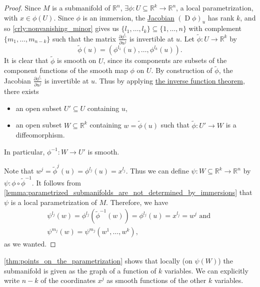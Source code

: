 \documentclass[notoc,notitlepage]{tufte-book}
\DeclareMathOperator{\D}{D}
\begin{document}
\begin{proof}
  Since $M$ is a submanifold of $\mathbb{R}^n$, $\exists \phi : U \subseteq
  \mathbb{R}^k \to \mathbb{R}^n$, a local parametrization, with $x \in \phi(U)$.
  Since $\phi$ is an immersion, the \hyperref[defn:differential]{Jacobian} $(\D
  \phi)_u$ has rank $k$, and so \cref{crly:nonvanishing_minor} gives us $\{ l_1,
  \ldots, l_k \} \subseteq \{ 1, \ldots, n \}$ with complement $\{ m_1,
  \ldots, m_{n - k} \}$ such that the matrix $\frac{\partial \phi^{l_i}}{\partial
  u^j}$ is invertible at $u$. Let $\tilde{\phi} : U \to \mathbb{R}^k$ by
  \begin{equation*}
    \tilde{\phi}(u) = (\phi^{l_1}(u), \ldots, \phi^{l_k}(u)).
  \end{equation*}
  It is clear that $\tilde{\phi}$ is smooth on $U$, since its components are
  subsets of the component functions of the smooth map $\phi$ on $U$. By
  construction of $\tilde{\phi}$, the Jacobian $\frac{\partial
  \phi^{l_i}}{\partial u^j}$ is invertible at $u$. Thus by applying
  \hyperref[thm:inverse_function_theorem]{the inverse function theorem}, there
  exists
  \begin{itemize}
    \item an open subset $U' \subseteq U$ containing $u$,
    \item an open subset $W \subseteq \mathbb{R}^k$ containing $w =
      \tilde{\phi}(u)$ such that $\tilde{\phi} : U' \to W$ is a diffeomorphism.
  \end{itemize}
  In particular, $\phi^{-1} : W \to U'$ is smooth.

  Note that $w^j = \tilde{\phi}^j(u) = \phi^{l_j}(u) = x^{l_j}$. Thus we can
  define $\psi : W \subseteq \mathbb{R}^k \to \mathbb{R}^n$ by $\psi : \phi
  \circ \tilde{\phi}^{-1}$. It follows from
  \cref{lemma:parametrized_submanifolds_are_not_determined_by_immersions} that
  $\psi$ is a local parametrization of $M$. Therefore, we have
  \begin{gather*}
    \psi^{l_j}(w) = \phi^{l_j} ( \tilde{\phi}^{-1}(w) ) = \phi^{l_j}(u) =
    x^{l_j} = w^j \text{ and } \\
    \psi^{m_j}(w) = \psi^{m_j}(w^1, \ldots, w^k),
  \end{gather*}
  as we wanted.
\end{proof}

\begin{note}
  \cref{thm:points_on_the_parametrization} shows that locally (on $\psi(W)$) the
  submanifold is given as the graph of a function of $k$ variables. We can
  explicitly write $n - k$ of the coordinates $x^j$ as smooth functions of the
  other $k$ variables.
\end{note}
\end{document}
